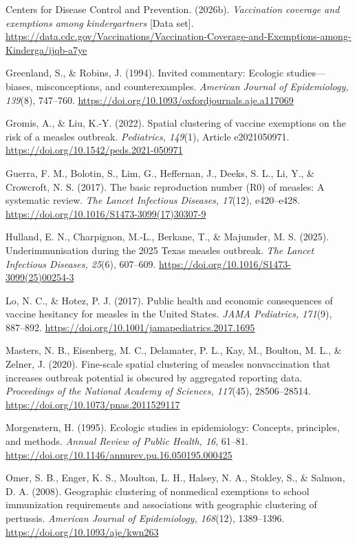 \documentclass[12pt]{article}
\begin{document}
Centers for Disease Control and Prevention. (2026b). \emph{Vaccination coverage and exemptions among kindergartners} [Data set]. \url{https://data.cdc.gov/Vaccinations/Vaccination-Coverage-and-Exemptions-among-Kinderga/ijqb-a7ye}

Greenland, S., \& Robins, J. (1994). Invited commentary: Ecologic studies---biases, misconceptions, and counterexamples. \emph{American Journal of Epidemiology, 139}(8), 747--760. \url{https://doi.org/10.1093/oxfordjournals.aje.a117069}

Gromis, A., \& Liu, K.-Y. (2022). Spatial clustering of vaccine exemptions on the risk of a measles outbreak. \emph{Pediatrics, 149}(1), Article e2021050971. \url{https://doi.org/10.1542/peds.2021-050971}

Guerra, F. M., Bolotin, S., Lim, G., Heffernan, J., Deeks, S. L., Li, Y., \& Crowcroft, N. S. (2017). The basic reproduction number (R0) of measles: A systematic review. \emph{The Lancet Infectious Diseases, 17}(12), e420--e428. \url{https://doi.org/10.1016/S1473-3099(17)30307-9}

Hulland, E. N., Charpignon, M.-L., Berkane, T., \& Majumder, M. S. (2025). Underimmunisation during the 2025 Texas measles outbreak. \emph{The Lancet Infectious Diseases, 25}(6), 607--609. \url{https://doi.org/10.1016/S1473-3099(25)00254-3}

Lo, N. C., \& Hotez, P. J. (2017). Public health and economic consequences of vaccine hesitancy for measles in the United States. \emph{JAMA Pediatrics, 171}(9), 887--892. \url{https://doi.org/10.1001/jamapediatrics.2017.1695}

Masters, N. B., Eisenberg, M. C., Delamater, P. L., Kay, M., Boulton, M. L., \& Zelner, J. (2020). Fine-scale spatial clustering of measles nonvaccination that increases outbreak potential is obscured by aggregated reporting data. \emph{Proceedings of the National Academy of Sciences, 117}(45), 28506--28514. \url{https://doi.org/10.1073/pnas.2011529117}

Morgenstern, H. (1995). Ecologic studies in epidemiology: Concepts, principles, and methods. \emph{Annual Review of Public Health, 16}, 61--81. \url{https://doi.org/10.1146/annurev.pu.16.050195.000425}

Omer, S. B., Enger, K. S., Moulton, L. H., Halsey, N. A., Stokley, S., \& Salmon, D. A. (2008). Geographic clustering of nonmedical exemptions to school immunization requirements and associations with geographic clustering of pertussis. \emph{American Journal of Epidemiology, 168}(12), 1389--1396. \url{https://doi.org/10.1093/aje/kwn263}
\end{document}
